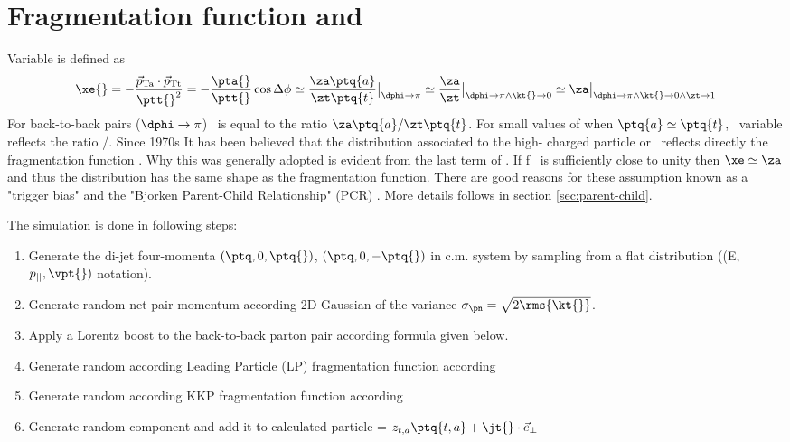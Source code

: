 
\clearpage
\section{Fragmentation function and \xe}

Variable \xe{} is defined as
\begin{equation}
\xe{} = - { \vec{p}_{\rm Ta}\cdot \vec{p}_{\rm Tt}   \over \ptt{}^{2}} =-{\pta{} \over \ptt{}} \cos\Delta\phi 
\simeq \frac{\za\ptq{a}}{\zt\ptq{t}} \big|_{\dphi\rightarrow\pi}
\simeq \frac{\za}{\zt} \big|_{\dphi\rightarrow\pi\wedge\kt{}\rightarrow 0}
\simeq \za \big|_{\dphi\rightarrow\pi\wedge\kt{}\rightarrow 0\wedge\zt\rightarrow 1}
\label{eq:xE} 
\end{equation} 
For back-to-back pairs ($\dphi\rightarrow\pi$) \xe\ is equal to the ratio $\za\ptq{a}/\zt\ptq{t}$. For small values of \kt{} when $\ptq{a}\simeq\ptq{t}$, \xe\ variable reflects the ratio \za/\zt.  Since 1970s It has been believed that the \xe{} distribution associated to the high-\pt{} charged particle or \piz\ reflects directly the fragmentation function \cite{CCOR_xe}. Why this was generally adopted  is evident from 
the last term of . If f \zt\ is sufficiently close to unity then $\xe\simeq\za$ and thus the \xe{} distribution has the same shape as the fragmentation function. There are good reasons for these assumption known as a "trigger bias" \cite{Jacob:1978mj} 
and the "Bjorken Parent-Child Relationship"  (PCR) \cite{Bjorken:1973kd}. More details follows in section \ref{sec:parent-child}.

The simulation is done in following steps:
\begin{enumerate}
\item Generate the di-jet four-momenta $(\ptq, 0,\ptq{})$, $(\ptq, 0,-\ptq{})$ in c.m. system by sampling from a flat distribution ((E,$p_{||}, \vpt{})$ notation). 
\item Generate random net-pair momentum \pn{} according 2D Gaussian of the variance $\sigma_{\pn}=\sqrt{2\rms{\kt{}}}$.
\item Apply a Lorentz boost to the back-to-back parton pair according formula given below.
\item Generate random \zt{} according Leading Particle (LP) fragmentation function according 
\item Generate random \za{} according KKP fragmentation function according 
\item Generate random \jt{} component and add it to calculated particle  = $z_{t,a}\ptq{t,a}+\jt{}\cdot\vec{e}_{\perp}$
\end{enumerate}

